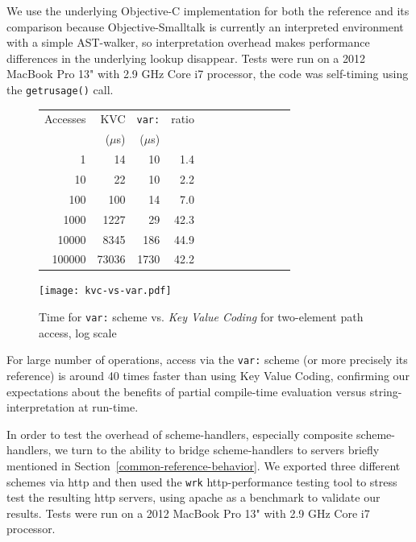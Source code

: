 \documentclass[preprint]{sigplanconf}
\begin{document}
We use the underlying Objective-C implementation for both the reference and its 
comparison because Objective-Smalltalk is currently an interpreted environment with
a simple AST-walker, so interpretation overhead makes performance differences in
the underlying lookup disappear.  Tests were run on a 2012 MacBook Pro 13" with 2.9 GHz Core i7 processor, the
code was self-timing using the {\tt getrusage()} call.  

\begin{figure}
\begin{minipage}[c]{0.38\textwidth}
\begin{tabular}{|r|r|r|r|r|r|r|r|r|r|r|r|} \hline
Accesses  & KVC& {\tt var:}   & ratio	\\ 
 & ($\mu$s) & ($\mu$s) & \\ \hline
1 & 14 & 10 & 1.4   \\ %
10 & 22 & 10 &   2.2 \\   %
100 & 100 & 14 &  7.0\\   %
1000 & 1227 & 29 &  42.3  \\  %
10000 & 8345 & 186 &   44.9 \\   %
100000 & 73036 & 1730 &    42.2 \\ \hline
\end{tabular}
\end{minipage}
\begin{minipage}[c]{0.39\textwidth}
\texttt{[image: kvc-vs-var.pdf]}
\end{minipage}
\vspace{-2.0em}
\caption{Time for  {\tt var:} scheme vs. \emph{Key Value Coding} for two-element path access, log scale}
\label{var-speed}
\end{figure}

For large number of operations, access via the {\tt var:} scheme (or more precisely its reference) is
around 40 times faster than using Key Value Coding, confirming our expectations about the benefits
of partial compile-time evaluation versus string-interpretation at run-time.  

In order to test the overhead of scheme-handlers, especially composite scheme-handlers, we turn
to the ability to bridge scheme-handlers to servers briefly mentioned in Section~\ref{common-reference-behavior}.
We exported three different schemes via http and then used the {\tt wrk} http-performance testing tool to stress
test the resulting http servers, using apache as a benchmark to validate our results.  Tests were run on a 2012 MacBook Pro 13" with 2.9 GHz Core i7 processor.
\end{document}
